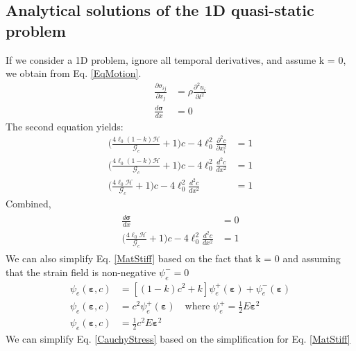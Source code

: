 \documentclass[12pt,3p]{article}
\numberwithin{equation}{section}
\begin{document}
\subsection{Analytical solutions of the 1D quasi-static problem}
If we consider a 1D problem, ignore all temporal derivatives, and assume k = 0, we obtain from Eq. \ref{EqMotion}. 
\begin{align*}
\frac{\partial \sigma_{i j}}{\partial x_j} &= \rho \frac{\partial^2 u_i}{\partial t^2} \\
\frac{d \boldsymbol{\sigma}}{dx} &= 0
\end{align*}
The second equation yields: 
\begin{align*}
\bigg( \frac{4 \ell_0 (1 - k) \mathcal{H}}{\mathcal{G}_c} + 1 \bigg) c - 4 \ell_{0}^2 \frac{\partial^2 c}{\partial x_i^2} &= 1 \\
\bigg( \frac{4 \ell_0 (1 - k) \mathcal{H}}{\mathcal{G}_c} + 1 \bigg) c - 4 \ell_{0}^2 \frac{d^2 c}{d x^2} &= 1 \\
\bigg( \frac{4 \ell_0 \mathcal{H}}{\mathcal{G}_c} + 1 \bigg) c - 4 \ell_{0}^2 \frac{d^2 c}{d x^2} &= 1\end{align*}
Combined, 
\begin{align}\label{1DQuasiStaticMotion}
\begin{split}
\frac{d \boldsymbol{\sigma}}{dx} &= 0 \\
\bigg( \frac{4 \ell_0 \mathcal{H}}{\mathcal{G}_c} + 1 \bigg) c - 4 \ell_{0}^2 \frac{d^2 c}{d x^2} &= 1 
\end{split}
\end{align}
We can also simplify Eq. \ref{MatStiff} based on the fact that k = 0 and assuming that the strain field is non-negative $\psi_{e}^{-}  = 0$
\begin{align*}
\psi_{e}(\boldsymbol{\varepsilon}, c) &=\left[(1-k) c^{2} + k\right] \psi_{e}^{+}(\boldsymbol{\varepsilon})+\psi_{e}^{-}(\boldsymbol{\varepsilon}) \\
\psi_{e}(\boldsymbol{\varepsilon}, c) &= c^{2} \psi_{e}^{+} (\boldsymbol{\varepsilon}) \quad \text{where }  \psi_{e}^{+} = \frac{1}{2} E \boldsymbol{\varepsilon}^2 \\
\psi_{e}(\boldsymbol{\varepsilon}, c) &= \frac{1}{2} c^{2} E \boldsymbol{\varepsilon}^2 
\end{align*}
We can simplify Eq. \ref{CauchyStress} based on the simplification for Eq. \ref{MatStiff}
\end{document}
